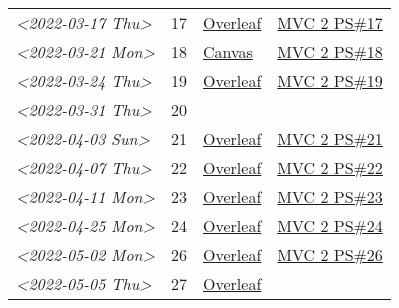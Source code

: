 \documentclass[letterpaper]{article}
\begin{document}
\begin{center}
\begin{tabular}{lrll}
\textit{<2022-03-17 Thu>} & 17 & \href{https://www.overleaf.com/project/6231772f4c6371c98cbaabd1}{Overleaf} & \href{../../../src/mathematics/multi_variable_calculus/KBhmvc_2_ps_17.org}{MVC 2 PS\#17}\\
\textit{<2022-03-21 Mon>} & 18 & \href{https://nuevaschool.instructure.com/courses/4135/assignments/68844}{Canvas} & \href{../../../src/mathematics/multi_variable_calculus/KBhmvc_2_ps_18.org}{MVC 2 PS\#18}\\
\textit{<2022-03-24 Thu>} & 19 & \href{https://www.overleaf.com/project/623890fa572c20eb441fee68}{Overleaf} & \href{../../../src/mathematics/multi_variable_calculus/KBh2_ps_19.org}{MVC 2 PS\#19}\\
\textit{<2022-03-31 Thu>} & 20 &  & \\
\textit{<2022-04-03 Sun>} & 21 & \href{https://www.overleaf.com/project/6249e9f782a57a451c5682c5}{Overleaf} & \href{../../../src/mathematics/multi_variable_calculus/KBhmvc_2_ps_21.org}{MVC 2 PS\#21}\\
\textit{<2022-04-07 Thu>} & 22 & \href{https://www.overleaf.com/project/624dee9cdb42f35fa74609ac}{Overleaf} & \href{../../../src/mathematics/multi_variable_calculus/KBhmvc_2_ps_22.org}{MVC 2 PS\#22}\\
\textit{<2022-04-11 Mon>} & 23 & \href{https://www.overleaf.com/read/bmpwkkpvgkyp}{Overleaf} & \href{../../../src/mathematics/multi_variable_calculus/KBhmvc_2_ps_23.org}{MVC 2 PS\#23}\\
\textit{<2022-04-25 Mon>} & 24 & \href{https://www.overleaf.com/read/bmpwkkpvgkyp}{Overleaf} & \href{../../../src/mathematics/multi_variable_calculus/KBhmvc_2_ps_24.org}{MVC 2 PS\#24}\\
\textit{<2022-05-02 Mon>} & 26 & \href{https://www.overleaf.com/project/624dee9cdb42f35fa74609ac}{Overleaf} & \href{../../../src/mathematics/multi_variable_calculus/KBhmvc_2_ps_26.org}{MVC 2 PS\#26}\\
\textit{<2022-05-05 Thu>} & 27 & \href{https://www.overleaf.com/project/624dee9cdb42f35fa74609ac}{Overleaf} & \\
\end{tabular}
\end{center}
\end{document}
